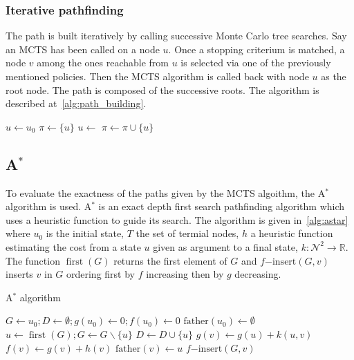 \documentclass[oneside,twocolumn]{article}
\DeclareMathOperator{\argmax}{argmax}
\DeclareMathOperator{\first}{first}
\begin{document}
\subsubsection{Iterative pathfinding}
The path is built iteratively by calling successive Monte Carlo tree searches.
Say an MCTS has been called on a node \(u\). Once a stopping criterium is
matched, a node \(v\) among the ones reachable from \(u\) is selected via one of
the previously mentioned policies. Then the MCTS algorithm is called back with
node \(u\)
as the root node. The path is composed of the successive roots. The algorithm is
described at~\ref{alg:path_building}.
\begin{algorithm}
  \caption{%
    Path building. The {\sc NextNode} (here max-child) function is one among
    those in~\ref{sssec:node_selection}.
  }\label{alg:path_building}
  \begin{algorithmic}
    \State{}\(u \gets u_0\)
    \State{}\(\pi \gets \{u\}\)
      \State{}
      \State{}\(u \gets\)
      \State{}\(\pi \gets \pi \cup \{u\}\)
    \EndFor{}
    \State{}\Return{$\pi$}
    \EndFunction{}
    \State{}\Return{$\argmax\{\mu_v | v \text{\,children of\,} u\}$}
    \EndFunction{}
  \end{algorithmic}
\end{algorithm}
\subsection{A\(^*\)}
To evaluate the exactness of the paths given by the MCTS algoithm, the A\(^*\)
algorithm is used. A\(^*\) is an exact depth first search pathfinding algorithm
which uses a heuristic function to guide its search. The algorithm is given
in~\ref{alg:astar} where \(u_0\) is the initial state, \(T\) the set of termial
nodes, \(h\) a heuristic function estimating the cost from a state \(u\) given
as argument to a final state, \(k \colon \mathcal{N}^2 \to \mathbb{R}\). The
function \(\first(G)\) returns the first element of \(G\) and
\(f\mathup{-insert}(G, v)\) inserts \(v\) in \(G\) ordering first by \(f\)
increasing then by \(g\) decreasing.
\begin{algorithm}
  \caption{A\(^*\) algorithm~\cite{alliotschiex2002ia&it}}\label{alg:astar}
  \begin{algorithmic}
    \State{}\(G \gets u_0; D \gets \emptyset; g(u_0) \gets 0; f(u_0) \gets 0\)
    \State{}\(\mathup{father}(u_0) \gets \emptyset\)
    \State{}\(u \gets \first(G); G \gets G \backslash \{u\}\)
    \State{}\(D \gets D \cup \{u\}\)
    \State{}
    \EndIf{}
    \State{}\(g(v) \gets g(u) + k(u, v)\)
    \State{}\(f(v) \gets g(v) + h(v)\)
    \State{}\(\mathup{father}(v) \gets u\)
    \State{}\(f\mathup{-insert}(G, v)\)
    \EndIf{}
    \EndFor{}
    \EndWhile{}
    \EndProcedure{}
  \end{algorithmic}
\end{algorithm}
\end{document}
